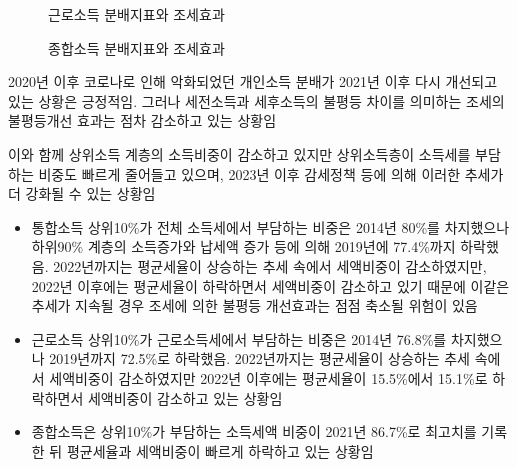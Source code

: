 \documentclass[
  a4paper,
  oneside,
  open=any]{scrbook}
\begin{document}
\begin{figure}

\caption{\label{fig-dist3_2}근로소득 분배지표와 조세효과}


\end{figure}%

\begin{figure}

\caption{\label{fig-dist3_3}종합소득 분배지표와 조세효과}


\end{figure}%

2020년 이후 코로나로 인해 악화되었던 개인소득 분배가 2021년 이후 다시
개선되고 있는 상황은 긍정적임. 그러나 세전소득과 세후소득의 불평등
차이를 의미하는 조세의 불평등개선 효과는 점차 감소하고 있는 상황임

이와 함께 상위소득 계층의 소득비중이 감소하고 있지만 상위소득층이
소득세를 부담하는 비중도 빠르게 줄어들고 있으며, 2023년 이후 감세정책
등에 의해 이러한 추세가 더 강화될 수 있는 상황임

\begin{itemize}
\item
  통합소득 상위10\%가 전체 소득세에서 부담하는 비중은 2014년 80\%를
  차지했으나 하위90\% 계층의 소득증가와 납세액 증가 등에 의해 2019년에
  77.4\%까지 하락했음. 2022년까지는 평균세율이 상승하는 추세 속에서
  세액비중이 감소하였지만, 2022년 이후에는 평균세율이 하락하면서
  세액비중이 감소하고 있기 때문에 이같은 추세가 지속될 경우 조세에 의한
  불평등 개선효과는 점점 축소될 위험이 있음
\item
  근로소득 상위10\%가 근로소득세에서 부담하는 비중은 2014년 76.8\%를
  차지했으나 2019년까지 72.5\%로 하락했음. 2022년까지는 평균세율이
  상승하는 추세 속에서 세액비중이 감소하였지만 2022년 이후에는
  평균세율이 15.5\%에서 15.1\%로 하락하면서 세액비중이 감소하고 있는
  상황임
\item
  종합소득은 상위10\%가 부담하는 소득세액 비중이 2021년 86.7\%로
  최고치를 기록한 뒤 평균세율과 세액비중이 빠르게 하락하고 있는 상황임
\end{itemize}
\end{document}
